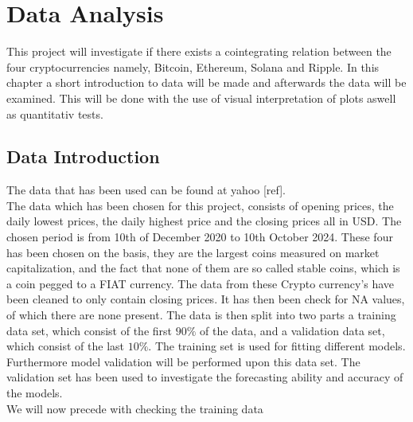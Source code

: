 \chapter{Data Analysis}\label{chap:dataanlysis}
This project will investigate if there exists a cointegrating relation between the four cryptocurrencies namely, Bitcoin, Ethereum, Solana and Ripple. In this chapter a short introduction to data will be made and afterwards the data will be examined. This will be done with the use of visual interpretation of plots aswell as quantitativ tests.

\section{Data Introduction}
The data that has been used can be found at yahoo  [ref].\\
The data which has been chosen for this project, consists of opening prices, the daily lowest prices, the daily highest price and the closing prices all in USD. The chosen period is from 10th of December 2020 to 10th October 2024. These four has been chosen on the basis, they are the largest coins measured on market capitalization, and the fact that none of them are so called stable coins, which is a coin pegged to a FIAT currency. The data from these Crypto currency's have been cleaned to only contain closing prices. It has then been check for NA values, of which there are none present. The data is then split into two parts a training data set, which consist of the first $90\%$ of the data, and a validation data set, which consist of the last $10\%$. The training set is used for fitting different models. Furthermore model validation will be performed upon this data set. The validation set has been used to investigate the forecasting ability and accuracy of the models.\\
We will now precede with checking the training data
